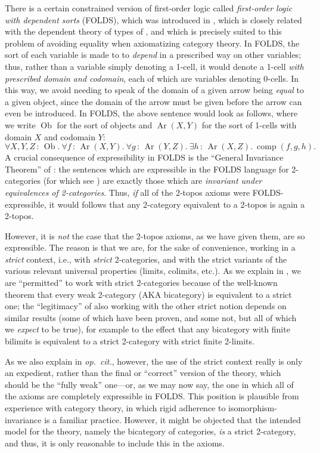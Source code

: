 \documentclass{amsart}
\newcommand\Ar{\operatorname{Ar}}
\newcommand\comp{\operatorname{comp}}
\newcommand\Ob{\operatorname{Ob}}
\newcommand\opcit{\textit{op.~cit.}}
\newcommand\tolon{{\,:\,}}
\theoremstyle{definition}
\theoremstyle{remark}
\theoremstyle{plainwithref}
\begin{document}
There is a certain constrained version of first-order logic called \emph{first-order logic with dependent sorts} (FOLDS), which was introduced in \cite{makkai-folds}, which is closely related with the dependent theory of types of \cite{ml72}, and which is precisely suited to this problem of avoiding equality when axiomatizing category theory.
In FOLDS, the sort of each variable is made to to \emph{depend} in a prescribed way on other variables; thus, rather than a variable simply denoting a 1-cell, it would denote a 1-cell \emph{with prescribed domain and codomain}, each of which are variables denoting 0-cells.
In this way, we avoid needing to speak of the domain of a given arrow being \emph{equal} to a given object, since the domain of the arrow must be given before the arrow can even be introduced.
In FOLDS, the above sentence would look as follows, where we write \( \Ob \) for the sort of objects and \( \Ar(X, Y) \) for the sort of 1-cells with domain \( X \) and codomain \( Y \):
\[
  \forall X,Y,Z \tolon \Ob.\ %
  \forall f \tolon \Ar(X,Y).\ %
  \forall g \tolon \Ar(Y,Z).\ %
  \exists h \tolon \Ar(X,Z).\ %
  \comp(f,g,h).
\]
A crucial consequence of expressibility in FOLDS is the ``General Invariance Theorem'' of \cite{makkai-folds}: the sentences which are expressible in the FOLDS language for 2-categories (for which see \cite[\S7]{makkai-folds}) are exactly those which are \emph{invariant under equivalences of 2-categories}.
Thus, \emph{if} all of the 2-topos axioms were FOLDS-expressible, it would follows that any 2-category equivalent to a 2-topos is again a 2-topos.

However, it is \emph{not} the case that the 2-topos axioms, as we have given them, are so expressible.
The reason is that we are, for the sake of convenience, working in a \emph{strict} context, i.e., with \emph{strict} 2-categories, and with the strict variants of the various relevant universal properties (limits, colimits, etc.).
As we explain in \cite{helfer-topoi-in-topoi}, we are ``permitted'' to work with strict 2-categories because of the well-known theorem that every weak 2-category (AKA bicategory) is equivalent to a strict one; the ``legitimacy'' of also working with the other strict notion depends on similar results (some of which have been proven, and some not, but all of which we \emph{expect} to be true), for example to the effect that any bicategory with finite bilimits is equivalent to a strict 2-category with strict finite 2-limits.

As we also explain in \opcit, however, the use of the strict context really is only an expedient, rather than the final or ``correct'' version of the theory, which should be the ``fully weak'' one---or, as we may now say, the one in which all of the axioms are completely expressible in FOLDS.
This position is plausible from experience with category theory, in which rigid adherence to isomorphism-invariance is a familiar practice.
However, it might be objected that the intended model for the theory, namely the bicategory of categories, \emph{is} a strict 2-category, and thus, it is only reasonable to include this in the axioms.
\end{document}

